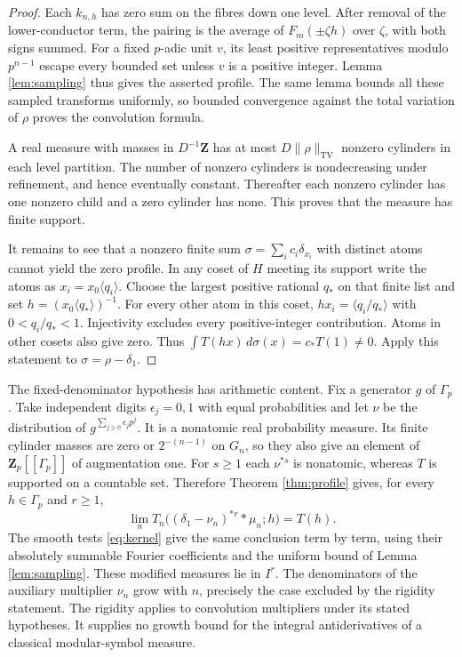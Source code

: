 \documentclass[11pt]{article}
\newcommand{\Z}{\mathbf Z}
\begin{document}
\begin{proof}
Each \(k_{n,h}\) has zero sum on the fibres down one level.
After removal of the lower-conductor term, the pairing is the average
of \(F_m(\pm\zeta h)\) over \(\zeta\), with both signs summed. For a
fixed \(p\)-adic unit \(v\), its least positive representatives modulo
\(p^{n-1}\) escape every bounded set unless \(v\) is a positive
integer. Lemma \ref{lem:sampling} thus gives the asserted profile.
The same lemma bounds all these sampled transforms uniformly, so
bounded convergence against the total variation of \(\rho\) proves
the convolution formula.

A real measure with masses in \(D^{-1}\Z\) has at most
\(D\|\rho\|_{\mathrm{TV}}\) nonzero cylinders in each level partition.
The number of nonzero cylinders is nondecreasing under refinement,
and hence eventually constant. Thereafter each nonzero cylinder has
one nonzero child and a zero cylinder has none. This proves that the
measure has finite support.

It remains to see that a nonzero finite sum
\(\sigma=\sum_i c_i\delta_{x_i}\) with distinct atoms cannot yield
the zero profile. In any coset of \(H\) meeting its support write the
atoms as \(x_i=x_0\langle q_i\rangle\). Choose the largest positive
rational \(q_*\) on that finite list and set
\(h=(x_0\langle q_*\rangle)^{-1}\). For every other atom in this
coset, \(hx_i=\langle q_i/q_*\rangle\) with \(0<q_i/q_*<1\).
Injectivity excludes every positive-integer contribution. Atoms in
other cosets also give zero. Thus \(\int T(hx)\,d\sigma(x)=c_*T(1)\ne0\).
Apply this statement to \(\sigma=\rho-\delta_1\).
\end{proof}

The fixed-denominator hypothesis has arithmetic content. Fix a
generator \(g\) of \(\Gamma_p\). Take independent digits
\(\epsilon_j=0,1\) with equal probabilities and let \(\nu\) be the
distribution of \(g^{\sum_{j\ge0}\epsilon_jp^j}\).
It is a nonatomic real probability measure. Its finite cylinder
masses are zero or \(2^{-(n-1)}\) on \(G_n\), so they also give
an element of \(\Z_p[[\Gamma_p]]\) of augmentation one. For \(s\ge1\)
each \(\nu^{*s}\) is nonatomic, whereas \(T\) is supported on a
countable set. Therefore Theorem \ref{thm:profile} gives, for every
\(h\in\Gamma_p\) and \(r\ge1\),
\[
 \lim_n T_n\big((\delta_1-\nu_n)^{*r}*\mu_n;h\big)=T(h).
\]
The smooth tests \eqref{eq:kernel} give the same conclusion term by
term, using their absolutely summable Fourier coefficients and the
uniform bound of Lemma \ref{lem:sampling}. These modified measures lie
in \(I^r\). The denominators of the auxiliary multiplier \(\nu_n\)
grow with \(n\), precisely the case excluded by the rigidity statement.
The rigidity applies to convolution multipliers under its stated
hypotheses. It supplies no growth bound for the integral
antiderivatives of a classical modular-symbol measure.
\end{document}
